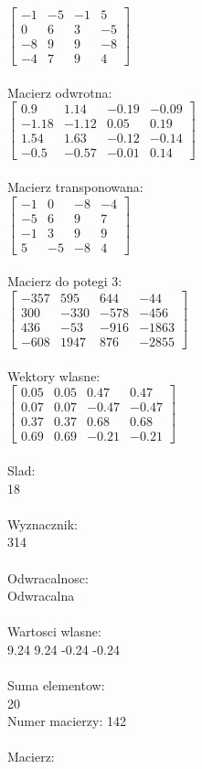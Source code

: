 \documentclass[a4paper,12pt]{article}
\begin{document}
$\begin{bmatrix} -1&-5&-1&5\\0&6&3&-5\\-8&9&9&-8\\-4&7&9&4 \end{bmatrix}$
\\
\\
Macierz odwrotna:\\

$\begin{bmatrix} 0.9&1.14&-0.19&-0.09\\-1.18&-1.12&0.05&0.19\\1.54&1.63&-0.12&-0.14\\-0.5&-0.57&-0.01&0.14 \end{bmatrix}$
\\
\\
Macierz transponowana:\\

$\begin{bmatrix} -1&0&-8&-4\\-5&6&9&7\\-1&3&9&9\\5&-5&-8&4 \end{bmatrix}$
\\
\\
Macierz do potegi 3:\\

$\begin{bmatrix} -357&595&644&-44\\300&-330&-578&-456\\436&-53&-916&-1863\\-608&1947&876&-2855 \end{bmatrix}$
\\
\\
Wektory wlasne:\\

$\begin{bmatrix} 0.05&0.05&0.47&0.47\\0.07&0.07&-0.47&-0.47\\0.37&0.37&0.68&0.68\\0.69&0.69&-0.21&-0.21 \end{bmatrix}$
\\
\\
Slad:\\
18
\\
\\
Wyznacznik:\\
314
\\
\\
Odwracalnosc:\\
Odwracalna
\\
\\
Wartosci wlasne:\\
9.24 9.24 -0.24 -0.24
\\
\\
Suma elementow:\\
20
\\
\newpage
Numer macierzy:
142
\\
\\
Macierz:\\
\end{document}
